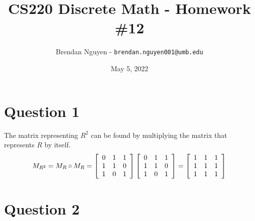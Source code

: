\documentclass[11pt]{article}
\title{CS220 Discrete Math - Homework \#12}
\author{Brendan Nguyen - \texttt{brendan.nguyen001@umb.edu}}
\date{May 5, 2022}
\begin{document}
\maketitle

\section*{Question 1}
The matrix representing $R^2$ can be found by multiplying the matrix that represents $R$ by itself.
\[
M_{R^2} = M_R \circ M_R = 
\left[
\begin{array}{c c c}
    0 & 1 & 1 \\
    1 & 1 & 0 \\
    1 & 0 & 1
\end{array}
\right]
\left[
\begin{array}{c c c}
    0 & 1 & 1 \\
    1 & 1 & 0 \\
    1 & 0 & 1
\end{array}
\right]
= 
\left[
\begin{array}{c c c}
    1 & 1 & 1 \\
    1 & 1 & 1 \\
    1 & 1 & 1
\end{array}
\right]
\]

\section*{Question 2}
\end{document}
